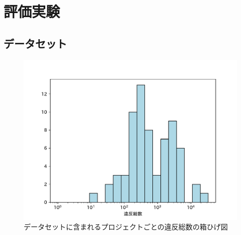 \documentclass[11pt,dvipdfmx]{jreport}
\begin{document}
\chapter{評価実験}\label{chap:result}

\section{データセット}

\begin{figure}[tbp]
	\centering
	\includegraphics[width=0.7\linewidth]{Kameoka_fig/dataset_hist.pdf}
	\caption{データセットに含まれるプロジェクトごとの違反総数の箱ひげ図}
	\label{fig:dataset}
\end{figure}

\end{document}
